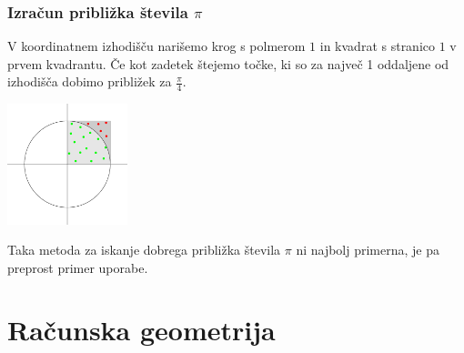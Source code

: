 \documentclass[10pt,a4paper,oneside]{book}
\begin{document}
\subsection{Izračun približka števila $\pi$}
V koordinatnem izhodišču narišemo krog s polmerom $1$ in kvadrat s stranico $1$ v prvem kvadrantu. Če kot zadetek štejemo točke, ki so za največ 1 oddaljene od izhodišča dobimo približek za $\frac{\pi}{4}$.

\begin{center}
	\includegraphics[width=35mm]{MonteCarloPi}

\end{center}


Taka metoda za iskanje dobrega približka števila $\pi$ ni najbolj primerna, je pa preprost primer uporabe.

\chapter{Računska geometrija}
\end{document}
